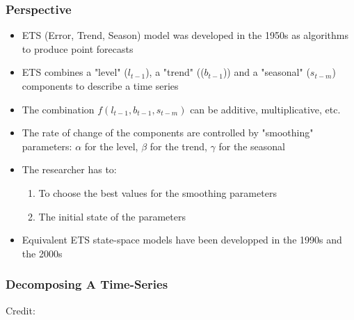 \documentclass{beamer}
\begin{document}
\begin{frame}
  \frametitle{Perspective}
  
  \begin{itemize}
  \item ETS (Error, Trend, Season) model was developed in the 1950s as algorithms to produce point forecasts
  \item ETS combines a "level" ($l_{t-1}$), a "trend" (($b_{t-1}$)) and a "seasonal" ($s_{t-m}$) components to describe a time series
  \item The combination $f(l_{t-1}, b_{t-1}, s_{t-m})$ can be additive, multiplicative, etc.
  \item The rate of change of the components are controlled by "smoothing" parameters: $\alpha$ for the level, $\beta$ for the trend, $\gamma$ for the seasonal
  \item The researcher has to:
    \begin{enumerate}
    \item To choose the best values for the smoothing parameters 
    \item The initial state of the parameters
    \end{enumerate}
  \item Equivalent ETS state-space models have been developped in the 1990s and the 2000s
  \end{itemize}
  
\end{frame}


\begin{frame}
  \frametitle{Decomposing A Time-Series}
  \hspace*{15pt}\hbox{\scriptsize Credit:}
\end{frame}
\end{document}
